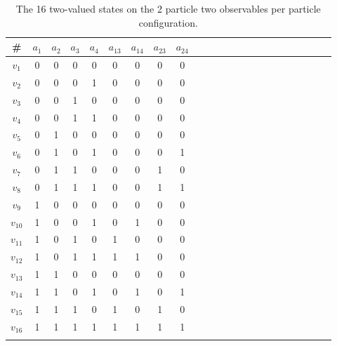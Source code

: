  \begin{table}%
 \begin{center}
 \caption{\label{2017-CHSH-tvs}  The 16 two-valued states on the 2 particle two observables per particle configuration.}
 \begin{tabular}{ccccccccccccccccccccccc}
\# &$a_1$&$a_2$&$a_3$&$a_4$&${  a_{13}}$&${  a_{14}}$&${  a_{23}}$&${  a_{24}}$\\
\hline
$v_1   $&0  &  0 &   0 &   0  & {  0}&   {  0} &  {  0}  &  {  0}\\
$v_2   $&0  &  0 &   0 &   1  & {  0}&   {  0} &  {   0}  &  {  0}\\
$v_3   $&0  &  0 &   1 &   0  & {  0}&   {  0} &  {   0}  &  {  0}\\
$v_4   $&0  &  0 &   1 &   1  & {  0}&   {  0} &  {   0}  &  {  0}\\
$v_5   $&0  &  1 &   0 &   0  & {  0}&   {  0} &  {   0}  &  {  0}\\
$v_6   $&0  &  1 &   0 &   1  & {  0}&   {  0} &  {  0}  &  {  1}\\
$v_7   $&0  &  1 &   1 &   0  & {  0}&   {  0} &  {  1}  &  {  0}\\
$v_8   $&0  &  1 &   1 &   1  & {  0}&   {  0} &  {  1}  &  {  1}\\
$v_9   $&1  &  0 &   0 &   0  & {  0}&   {  0} &  {   0}  &  {  0}\\
$v_{10}$&1  &  0 &   0 &   1  & {  0}&   {  1} &  {  0}  &  {  0}\\
$v_{11}$&1  &  0 &   1 &   0  & {  1}&   {  0} &  {  0}  &  {  0}\\
$v_{12}$&1  &  0 &   1 &   1  & {  1}&   {  1} &  {  0}  &  {  0}\\
$v_{13}$&1  &  1 &   0 &   0  & {  0}&   {  0} &  {   0}  &  {  0}\\
$v_{14}$&1  &  1 &   0 &   1  & {  0}&   {  1} &  {  0}  &  {  1}\\
$v_{15}$&1  &  1 &   1 &   0  & {  1}&   {  0} &  {  1}  &  {  0}\\
$v_{16}$&1  &  1 &   1 &   1  & {  1}&   {  1} &  {  1}  &  {  1}
\\ 
\end{tabular}
 \end{center}
 \end{table}

